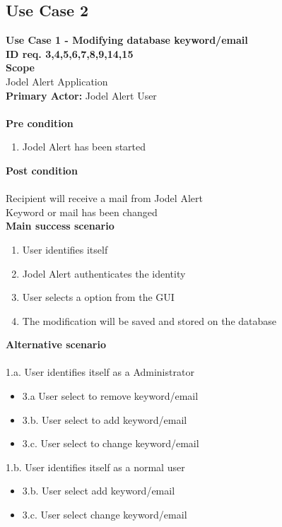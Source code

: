 \documentclass[a4paper,12pt]{article}
\begin{document}
\subsection{Use Case 2}
\textbf{Use Case 1 - Modifying database keyword/email}\\
\textbf{ID req. 3,4,5,6,7,8,9,14,15}\\
\textbf{Scope}\\
Jodel Alert Application\\
\textbf{Primary Actor:}
Jodel Alert User\\\\
\textbf{Pre condition}
\begin{enumerate}
	\item Jodel Alert has been started
\end{enumerate}
\textbf{Post condition}\\\\
Recipient will receive a mail from Jodel Alert\\
Keyword or mail has been changed\\
\textbf{Main success scenario}
\begin{enumerate}
	\item User identifies itself
	\item Jodel Alert authenticates the identity 
	\item User selects a option from the GUI
	\item The modification will be saved and stored on the database 
	
\end{enumerate}
\textbf{Alternative scenario}\\\\
1.a. User identifies itself as a Administrator
\begin{itemize}
	\item 3.a User select to remove keyword/email
	\item 3.b. User select to add keyword/email
	\item 3.c. User select to change keyword/email
\end{itemize}
1.b. User identifies itself as a normal user
\begin{itemize}
	\item 3.b. User select add keyword/email
	\item 3.c. User select change keyword/email
\end{itemize}
\clearpage
\end{document}
